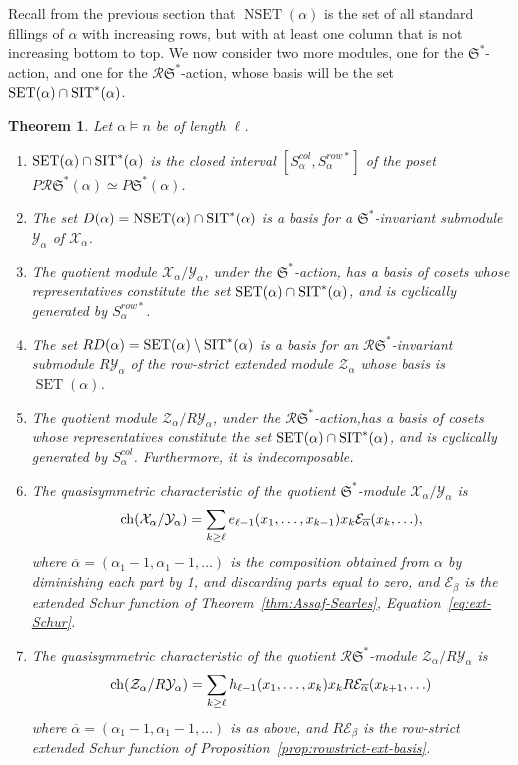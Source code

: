 \documentclass[12pt,letterpaper]{amsart}
\newtheorem{theorem}{Theorem}[section]
\theoremstyle{definition}
\newcommand{\dI}{\mathfrak{S}^*}
\newcommand{\rdI}{\mathcal{R}\mathfrak{S}^*}
\newcommand{\SET}{\ensuremath{\operatorname{SET}}} \newcommand{\NSET}{\ensuremath{\operatorname{NSET}}}\newcommand{\SRCT}{\ensuremath{\operatorname{SRCT}}}
\begin{document}
Recall from the previous section that $
\NSET(\alpha)$ is the set of all standard fillings of $\alpha$ with increasing rows, but with at least one column that is not increasing bottom to top.  We now consider two more modules, one for the $\dI$-action, and one for the $\rdI$-action, whose basis will be the set $\SET(\alpha)\cap\SIT^*(\alpha)$. 
\begin{theorem}\label{thm:SET-intersect-SIT*} Let $\alpha\vDash n$ be of length $\ell$.
\begin{enumerate}
\item $\SET(\alpha)\cap\SIT^*(\alpha)$ is the closed interval $[S^{col}_\alpha, S^{row*}_\alpha]$ of the poset $P\rdI(\alpha)\simeq P\dI(\alpha)$.
\item The set $D(\alpha)=\NSET(\alpha)\cap \SIT^*(\alpha)$ is a basis for a $\dI$-invariant submodule $\mathcal{Y}_\alpha$ of $\mathcal{X}_\alpha$. 
\item The quotient module $\mathcal{X}_\alpha/\mathcal{Y}_\alpha$, under the $\dI$-action,  has a basis of cosets 
whose representatives constitute the set $\SET(\alpha)\cap\SIT^*(\alpha)$, and is cyclically generated by $S^{row*}_\alpha$. 
\item The set $RD(\alpha)=\SET(\alpha)\setminus \SIT^*(\alpha)$ is a basis for an $\rdI$-invariant submodule ${R\mathcal{Y}}_\alpha$ of the row-strict extended module $\mathcal{Z}_\alpha$ whose basis is $\SET(\alpha)$. 
\item The quotient module  $\mathcal{Z}_\alpha/R{\mathcal{Y}}_\alpha$, under the $\rdI$-action,has a basis of cosets 
whose representatives constitute the set  $\SET(\alpha)\cap\SIT^*(\alpha)$, and is cyclically generated by $S^{col}_\alpha$.  Furthermore, it is indecomposable.
\item The quasisymmetric characteristic of the quotient $\dI$-module $\mathcal{X}_\alpha/\mathcal{Y}_\alpha$ is 
\begin{equation}\label{eqn:Steph} \operatorname{\mathrm{ch}}(\mathcal{X}_\alpha/\mathcal{Y}_\alpha)=
\sum _{k\geq \ell} e_{\ell -1} (x_1, \ldots, x_{k-1}) x_k \mathcal{E}_{\overline{\alpha}} (x_k, \ldots),
\end{equation}
where $\overline{\alpha}=(\alpha_1-1, \alpha_1-1,\ldots)$ is the composition obtained from $\alpha$ by diminishing each part by 1, and discarding parts equal to zero, and $\mathcal{E}_\beta$ is the extended Schur function of Theorem~\ref{thm:Assaf-Searles}, Equation~\eqref{eq:ext-Schur}.
\item The quasisymmetric characteristic of the quotient $\rdI$-module $\mathcal{Z}_\alpha/R\mathcal{Y}_\alpha$ is 
\begin{equation}\label{Sheila-Elizabeth2022Feb21}
 \operatorname{\mathrm{ch}}(\mathcal{Z}_\alpha/R{\mathcal{Y}}_\alpha)=
\sum _{k\geq \ell} h_{\ell -1} (x_1, \ldots, x_k) x_k R\mathcal{E}_{\overline{\alpha}} (x_{k+1}, \ldots)
\end{equation}
where $\overline{\alpha}=(\alpha_1-1, \alpha_1-1,\ldots)$ is as above, and $R\mathcal{E}_\beta$ is the row-strict extended Schur function of Proposition~\ref{prop:rowstrict-ext-basis}.
\end{enumerate}
\end{theorem}
\end{document}
